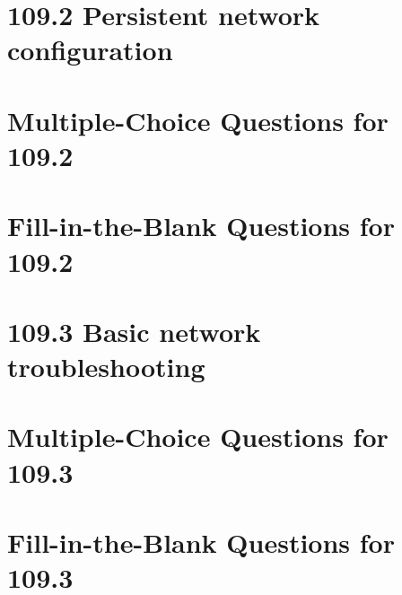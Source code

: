 \documentclass[a4paper]{report}
\begin{document}
\section*{109.2 Persistent network configuration}

\newpage
\section*{Multiple-Choice Questions for 109.2}

\newpage
\section*{Fill-in-the-Blank Questions for 109.2}

\newpage
\section*{109.3 Basic network troubleshooting}

\newpage
\section*{Multiple-Choice Questions for 109.3}

\newpage
\section*{Fill-in-the-Blank Questions for 109.3}

\newpage
\end{document}
